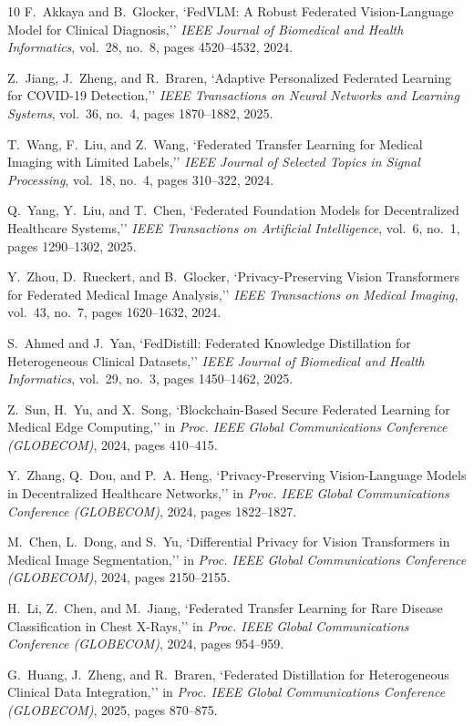 \documentclass[letterpaper, conference]{IEEEtran}
\begin{document}
\begin{thebibliography}{10}
F.~Akkaya and B.~Glocker,
`FedVLM: A Robust Federated Vision-Language Model for Clinical Diagnosis,''
\emph{IEEE Journal of Biomedical and Health Informatics}, vol.\ 28, no.\ 8, pages 4520--4532, 2024.

Z.~Jiang, J.~Zheng, and R.~Braren,
`Adaptive Personalized Federated Learning for COVID-19 Detection,''
\emph{IEEE Transactions on Neural Networks and Learning Systems}, vol.\ 36, no.\ 4, pages 1870--1882, 2025.

T.~Wang, F.~Liu, and Z.~Wang,
`Federated Transfer Learning for Medical Imaging with Limited Labels,''
\emph{IEEE Journal of Selected Topics in Signal Processing}, vol.\ 18, no.\ 4, pages 310--322, 2024.

Q.~Yang, Y.~Liu, and T.~Chen,
`Federated Foundation Models for Decentralized Healthcare Systems,''
\emph{IEEE Transactions on Artificial Intelligence}, vol.\ 6, no.\ 1, pages 1290--1302, 2025.

Y.~Zhou, D.~Rueckert, and B.~Glocker,
`Privacy-Preserving Vision Transformers for Federated Medical Image Analysis,''
\emph{IEEE Transactions on Medical Imaging}, vol.\ 43, no.\ 7, pages 1620--1632, 2024.

S.~Ahmed and J.~Yan,
`FedDistill: Federated Knowledge Distillation for Heterogeneous Clinical Datasets,''
\emph{IEEE Journal of Biomedical and Health Informatics}, vol.\ 29, no.\ 3, pages 1450--1462, 2025.

Z.~Sun, H.~Yu, and X.~Song,
`Blockchain-Based Secure Federated Learning for Medical Edge Computing,''
in \emph{Proc. IEEE Global Communications Conference (GLOBECOM)}, 2024, pages 410--415.

Y.~Zhang, Q.~Dou, and P.~A. Heng,
`Privacy-Preserving Vision-Language Models in Decentralized Healthcare Networks,''
in \emph{Proc. IEEE Global Communications Conference (GLOBECOM)}, 2024, pages 1822--1827.

M.~Chen, L.~Dong, and S.~Yu,
`Differential Privacy for Vision Transformers in Medical Image Segmentation,''
in \emph{Proc. IEEE Global Communications Conference (GLOBECOM)}, 2024, pages 2150--2155.

H.~Li, Z.~Chen, and M.~Jiang,
`Federated Transfer Learning for Rare Disease Classification in Chest X-Rays,''
in \emph{Proc. IEEE Global Communications Conference (GLOBECOM)}, 2024, pages 954--959.

G.~Huang, J.~Zheng, and R.~Braren,
`Federated Distillation for Heterogeneous Clinical Data Integration,''
in \emph{Proc. IEEE Global Communications Conference (GLOBECOM)}, 2025, pages 870--875.
\end{thebibliography}
\end{document}
